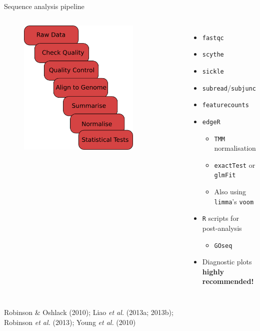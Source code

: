 \documentclass[t]{beamer}
\begin{document}
\begin{frame}{Sequence analysis pipeline}
  \begin{columns}[t]
      \begin{figure}[h]
        \begin{center}
          \includegraphics[width=0.8\textwidth]{img/informaticsFD.png}
        \end{center}
      \end{figure}
      \begin{itemize}
        \item \texttt{fastqc}
        \item \texttt{scythe}
        \item \texttt{sickle}
        \item \texttt{subread}/\texttt{subjunc}
        \item \texttt{featurecounts}
        \item \texttt{edgeR}
          \begin{itemize}
            \item \texttt{TMM} normalisation
            \item \texttt{exactTest} or \texttt{glmFit}
            \item Also using \texttt{limma}'s \texttt{voom}
          \end{itemize}
        \item \texttt{R} scripts for post-analysis
          \begin{itemize}
            \item \texttt{GOseq}
          \end{itemize}
          \item Diagnostic plots \textbf{highly recommended!}
      \end{itemize}
  \end{columns}
  \tiny{Robinson \& Oshlack (2010); Liao \textit{et al.} (2013a; 2013b);\\
  Robinson \textit{et al.} (2013); Young \textit{et al.} (2010)}
\end{frame}
\end{document}
